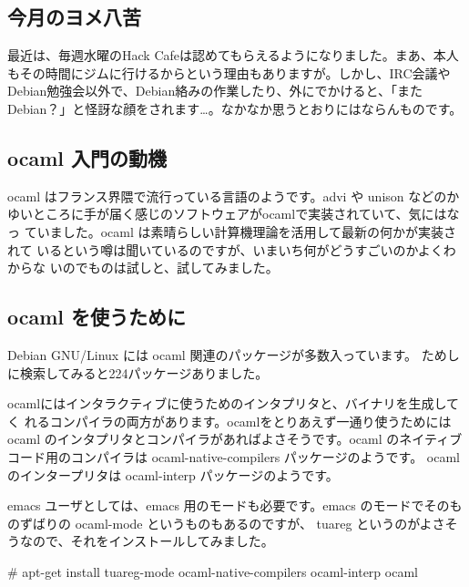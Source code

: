 \documentclass[mingoth,a4paper]{jsarticle}
\begin{document}
\subsection{今月のヨメ八苦}
最近は、毎週水曜のHack Cafeは認めてもらえるようになりました。まあ、本人もその時間にジムに行けるからという理由もありますが。しかし、IRC会議やDebian勉強会以外で、Debian絡みの作業したり、外にでかけると、「またDebian？」と怪訝な顔をされます…。なかなか思うとおりにはならんものです。



\subsection{ocaml 入門の動機}

ocaml はフランス界隈で流行っている言語のようです。advi や unison などのか
ゆいところに手が届く感じのソフトウェアがocamlで実装されていて、気にはなっ
ていました。ocaml は素晴らしい計算機理論を活用して最新の何かが実装されて
いるという噂は聞いているのですが、いまいち何がどうすごいのかよくわからな
いのでものは試しと、試してみました。

\subsection{ocaml を使うために}

Debian GNU/Linux には ocaml 関連のパッケージが多数入っています。
ためしに検索してみると224パッケージありました。

ocamlにはインタラクティブに使うためのインタプリタと、バイナリを生成してく
れるコンパイラの両方があります。ocamlをとりあえず一通り使うためには
ocaml のインタプリタとコンパイラがあればよさそうです。ocaml のネイティブ
コード用のコンパイラは ocaml-native-compilers パッケージのようです。
ocaml のインタープリタは ocaml-interp パッケージのようです。

emacs ユーザとしては、emacs 用のモードも必要です。emacs のモードでそのも
のずばりの ocaml-mode というものもあるのですが、 tuareg というのがよさそ
うなので、それをインストールしてみました。

\begin{commandline}
# apt-get install tuareg-mode ocaml-native-compilers ocaml-interp ocaml
\end{commandline}
\end{document}
